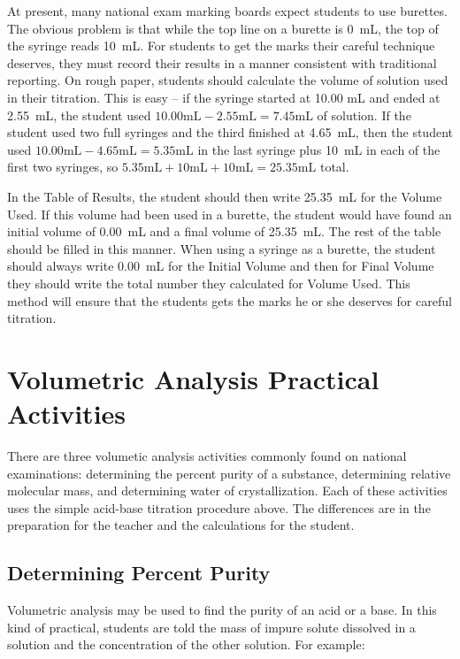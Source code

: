At present, many national exam marking boards expect students to use burettes. The obvious problem is that while the top line on a burette is 0~mL, the top of the syringe reads 10~mL. For students to get the marks their careful technique deserves, they must record their results in a manner consistent with traditional reporting. On rough paper, students should calculate the volume of solution used in their titration. This is easy -- if the syringe started at 10.00 mL and ended at 2.55~mL, the student used $10.00 \mathrm{mL} - 2.55 \mathrm{mL} = 7.45 \mathrm{mL}$ of solution. If the student used two full syringes and the third finished at 4.65~mL, then the student used $10.00 \mathrm{mL} - 4.65 \mathrm{mL} = 5.35 \mathrm{mL}$ in the last syringe plus 10~mL in each of the first two syringes, so $5.35 \mathrm{mL} + 10 \mathrm{mL} + 10 \mathrm{mL} = 25.35 \mathrm{mL}$ total.

In the Table of Results, the student should then write 25.35~mL for the Volume Used. If this volume had been used in a burette, the student would have found an initial volume of 0.00~mL and a final volume of 25.35~mL. The rest of the table should be filled in this manner. When using a syringe as a burette, the student should always write 0.00~mL for the Initial Volume and then for Final Volume they should write the total number they calculated for Volume Used. This method will ensure that the students gets the marks he or she deserves for careful titration.

\section{Volumetric Analysis Practical Activities}

There are three volumetic analysis activities commonly found on national examinations: determining the percent purity of a substance, determining relative molecular mass, and determining water of crystallization. Each of these activities uses the simple acid-base titration procedure above. The differences are in the preparation for the teacher and the calculations for the student.

\subsection{Determining Percent Purity}
Volumetric analysis may be used to find the purity of an acid or a base. In this kind of practical, students are told the mass of impure solute dissolved in a solution and the concentration of the other solution. 
For example: 

